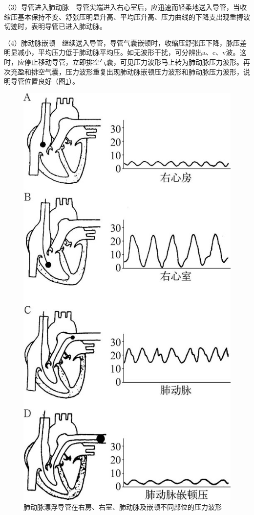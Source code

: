 （3）导管进入肺动脉　导管尖端进入右心室后，应迅速而轻柔地送入导管，当收缩压基本保持不变、舒张压明显升高、平均压升高、压力曲线的下降支出现重搏波切迹时，表明导管已进入肺动脉。

（4）肺动脉嵌顿　继续送入导管，导管气囊嵌顿时，收缩压舒张压下降，脉压差明显减小，平均压力低于肺动脉平均压。如无波形干扰，可分辨出a、c、v波。这时，应停止移动导管，立即排空气囊，可见压力波形马上转为肺动脉压力波形。再次充盈和排空气囊，压力波形重复出现肺动脉嵌顿压力波形和肺动脉压力波形，说明导管位置良好（图\ref{fig4-5}）。

\begin{figure}[!htbp]
 \centering
 \includegraphics{./images/Image00033.jpg}
 \captionsetup{justification=centering}
 \caption{肺动脉漂浮导管在右房、右室、肺动脉及嵌顿不同部位的压力波形}
 \label{fig4-5}
  \end{figure} 

